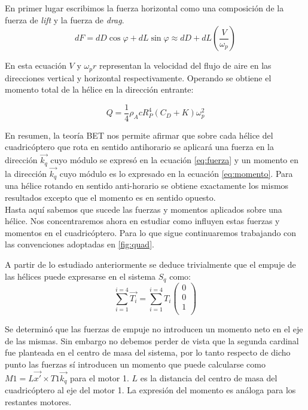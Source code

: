 \documentclass[main]{subfiles}
\begin{document}
En primer lugar escribimos la fuerza horizontal como una composici\'on de la fuerza de \emph{lift} y la fuerza de \emph{drag}. 
$$dF=dD\cos\varphi+dL\sin\varphi \approx dD +dL\left(\frac{V}{\omega_p}\right)$$

En esta ecuaci\'on $V$ y $\omega_p r$ representan la velocidad del flujo de aire en las direcciones vertical y horizontal respectivamente. Operando se obtiene el momento total de la h\'elice en la direcci\'on entrante:

\begin{equation}
\label{eq:momento}
Q=\frac{1}{4}\rho_A c R_P^4(C_D+K)\omega_p^2
\end{equation}

 

En resumen, la teor\'ia BET nos permite afirmar que sobre cada h\'elice del cuadric\'optero que rota en sentido antihorario se aplicar\'a una fuerza en la direcci\'on $\vec{k_q}$ cuyo m\'odulo se expres\'o en la ecuaci\'on \ref{eq:fuerza} y un momento en la direcci\'on $\vec{k_q}$ cuyo m\'odulo es lo expresado en la ecuaci\'on \ref{eq:momento}. Para una h\'elice rotando en sentido anti-horario se obtiene exactamente los mismos resultados excepto que el momento es en sentido opuesto.\\

Hasta aqu\'i sabemos que sucede las fuerzas y momentos aplicados sobre una h\'elice. Nos concentraremos ahora en estudiar como influyen estas fuerzas y momentos en el cuadric\'optero. Para lo que sigue continuaremos trabajando con las convenciones adoptadas en \ref{fig:quad}. 
 
A partir de lo estudiado anteriormente se deduce trivialmente que el empuje de las h\'elices puede expresarse en el sistema $S_q$ como:
$$
\sum_{i=1}^{i=4} \vec{T_i} =\sum_{i=1}^{i=4}T_i\left(\begin{array}{c}
0\\
0\\
1\\
\end{array} \right)
$$

Se determin\'o que las fuerzas de empuje no introducen un momento neto en el eje de las mismas. Sin embargo no debemos perder de vista que la segunda cardinal fue planteada en el centro de masa del sistema, por lo tanto respecto de dicho punto las fuerzas s\'i introducen un momento que puede calcularse como $M1=L\vec{x\prime} \times T1\vec{k_q}$ para el motor 1. $L$ es la distancia del centro de masa del cuadric\'optero al eje del motor 1. La expresi\'on del momento es an\'aloga para los restantes motores.
\end{document}
